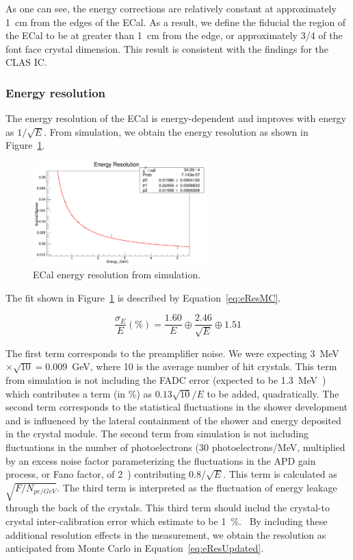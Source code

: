 As one can see, the energy corrections are relatively constant at approximately 1~cm from the edges of the ECal. As a result, we define the fiducial the region of the ECal to be at greater than 1~cm from the edge, or approximately 3/4 of the font face crystal dimension. This result is consistent with the findings for the CLAS IC.~\cite{Garcon} 

\subsubsection{Energy resolution}

The energy resolution of the ECal is energy-dependent and improves with energy as $1/\sqrt{E}$. From simulation, we obtain the energy resolution as shown in Figure~\ref{Figure:eResFitMC}.

\begin{figure}[H]
  \centering
      \includegraphics[width=0.6\textwidth]{pics/performance/eResFitMC.png}
  \caption[ECal energy resolution fitted from simulation]{ECal energy resolution from simulation.}
  \label{Figure:eResFitMC}
\end{figure}

The fit shown in Figure~\ref{Figure:eResFitMC} is described by Equation~\ref{eq:eResMC}.

\begin{equation}
\label{eq:eResMC}
\dfrac{\sigma_E}{E} (\%) = \dfrac{1.60}{E} \oplus \dfrac{2.46}{\sqrt{E}} \oplus 1.51
\end{equation}

The first term corresponds to the preamplifier noise. We were expecting 3~MeV$\times \sqrt{10} = 0.009$~GeV, where 10 is the average number of hit crystals. This term from simulation is not including the FADC error (expected to be 1.3~MeV~\cite{Charles}) which contributes a term (in $\%$) as $0.13\sqrt{10}/E$ to be added, quadratically. The second term corresponds to the statistical fluctuations in the shower development and is influenced by the lateral containment of the shower and energy deposited in the crystal module. The second term from simulation is not including fluctuations in the number of photoelectrons (30 photoelectrons/MeV, multiplied by an excess noise factor parameterizing the fluctuations in the APD gain process, or Fano factor, of 2~\cite{panda}) contributing $0.8/\sqrt{E}$. This term is calculated as $\sqrt{F/N_{pe/GeV}}$. The third term is interpreted as the fluctuation of energy leakage through the back of the crystals. This third term should includ the crystal-to crystal inter-calibration error which estimate to be 1~$\%$.~\cite{Garcon} By including these additional resolution effects in the measurement, we obtain the resolution as anticipated from Monte Carlo in Equation~\eqref{eq:eResUpdated}.


